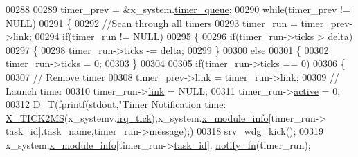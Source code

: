 \begin{DoxyCode}
{00288 
00289         timer\_prev = &x\_system.\hyperlink{a00037_a10669284e4e6a0d578a68a0b5fbe0d5b}{timer\_queue};
00290         \textcolor{keywordflow}{while}(timer\_prev != NULL)
00291         \{
00292             \textcolor{comment}{//Scan through all timers}
00293             timer\_run  = timer\_prev->\hyperlink{a00036_ac1b431c0d2de68ce090f223b32f212b5}{link};
00294             \textcolor{keywordflow}{if}(timer\_run != NULL)
00295             \{
00296                 \textcolor{keywordflow}{if}(timer\_run->\hyperlink{a00036_aca39a8370fadb7fdd20300deef646d8b}{ticks} > delta)
00297                 \{
00298                     timer\_run->\hyperlink{a00036_aca39a8370fadb7fdd20300deef646d8b}{ticks} -= delta;
00299                 \}
00300                 \textcolor{keywordflow}{else}
00301                 \{
00302                     timer\_run->\hyperlink{a00036_aca39a8370fadb7fdd20300deef646d8b}{ticks} = 0;
00303                 \}
00304 
00305                 \textcolor{keywordflow}{if}(timer\_run->\hyperlink{a00036_aca39a8370fadb7fdd20300deef646d8b}{ticks} == 0)
00306                 \{
00307                     \textcolor{comment}{// Remove timer}
00308                     timer\_prev->\hyperlink{a00036_ac1b431c0d2de68ce090f223b32f212b5}{link} = timer\_run->\hyperlink{a00036_ac1b431c0d2de68ce090f223b32f212b5}{link};
00309                     \textcolor{comment}{// Launch timer}
00310                     timer\_run->\hyperlink{a00036_ac1b431c0d2de68ce090f223b32f212b5}{link}   = NULL;
00311                     timer\_run->\hyperlink{a00036_a11c9c2b8514210c037aa45241ca62fb3}{active} = 0;
00312                     \hyperlink{a00040_a5e876f6543757da83f9b3ddee08dece7}{D\_T}(fprintf(stdout,\textcolor{stringliteral}{"Timer Notification time:%
      \hyperlink{a00036_a8c687347943f251bc052fa9a43a2b69b}{X\_TICK2MS}(x\_systemv.\hyperlink{a00037_ab73fa103937ad39e7e2fc55783c4c370}{irq\_tick}),x\_system.\hyperlink{a00037_a6724d1e1430a0e89c134b30152988385}{x\_module\_info}[timer\_run->
      \hyperlink{a00036_a21b41e494a28583d4da10f1afb1c5328}{task\_id}].\hyperlink{a00037_a530a0539bc1522a85f661b6e1c9ebebd}{task\_name},timer\_run->\hyperlink{a00036_adf9665938515a20c283eea2c978cf80d}{message});)
00318                     \hyperlink{a00067_a710d148845397582739d170341f3d3d9}{srv\_wdg\_kick}();
00319                     x\_system.\hyperlink{a00037_a6724d1e1430a0e89c134b30152988385}{x\_module\_info}[timer\_run->\hyperlink{a00036_a21b41e494a28583d4da10f1afb1c5328}{task\_id}].
      \hyperlink{a00037_af6e2104c75f84286ef0f813c7707ff11}{notify\_fn}(timer\_run);
}}
\end{DoxyCode}
